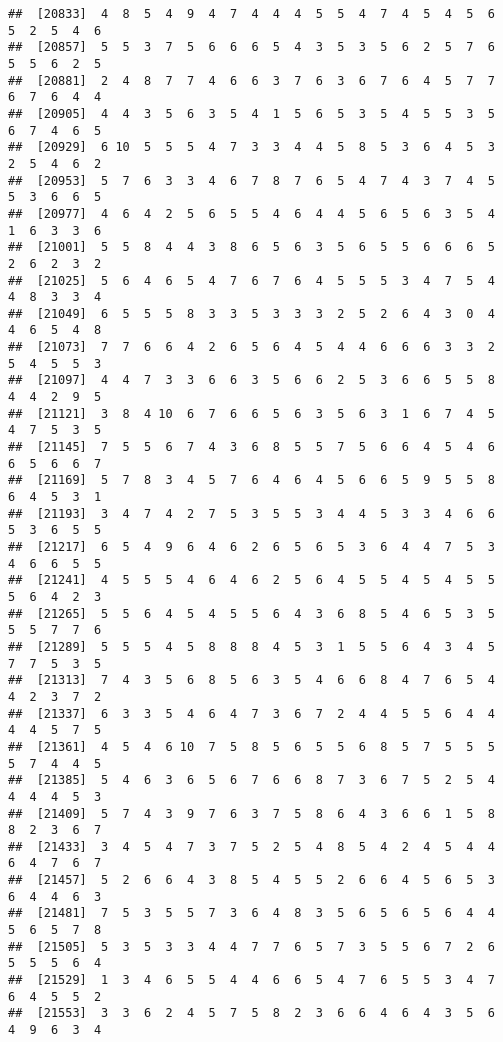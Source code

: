 \documentclass[
]{book}
\begin{document}
\begin{verbatim}
##  [20833]  4  8  5  4  9  4  7  4  4  4  5  5  4  7  4  5  4  5  6  5  2  5  4  6
##  [20857]  5  5  3  7  5  6  6  6  5  4  3  5  3  5  6  2  5  7  6  5  5  6  2  5
##  [20881]  2  4  8  7  7  4  6  6  3  7  6  3  6  7  6  4  5  7  7  6  7  6  4  4
##  [20905]  4  4  3  5  6  3  5  4  1  5  6  5  3  5  4  5  5  3  5  6  7  4  6  5
##  [20929]  6 10  5  5  5  4  7  3  3  4  4  5  8  5  3  6  4  5  3  2  5  4  6  2
##  [20953]  5  7  6  3  3  4  6  7  8  7  6  5  4  7  4  3  7  4  5  5  3  6  6  5
##  [20977]  4  6  4  2  5  6  5  5  4  6  4  4  5  6  5  6  3  5  4  1  6  3  3  6
##  [21001]  5  5  8  4  4  3  8  6  5  6  3  5  6  5  5  6  6  6  5  2  6  2  3  2
##  [21025]  5  6  4  6  5  4  7  6  7  6  4  5  5  5  3  4  7  5  4  4  8  3  3  4
##  [21049]  6  5  5  5  8  3  3  5  3  3  3  2  5  2  6  4  3  0  4  4  6  5  4  8
##  [21073]  7  7  6  6  4  2  6  5  6  4  5  4  4  6  6  6  3  3  2  5  4  5  5  3
##  [21097]  4  4  7  3  3  6  6  3  5  6  6  2  5  3  6  6  5  5  8  4  4  2  9  5
##  [21121]  3  8  4 10  6  7  6  6  5  6  3  5  6  3  1  6  7  4  5  4  7  5  3  5
##  [21145]  7  5  5  6  7  4  3  6  8  5  5  7  5  6  6  4  5  4  6  6  5  6  6  7
##  [21169]  5  7  8  3  4  5  7  6  4  6  4  5  6  6  5  9  5  5  8  6  4  5  3  1
##  [21193]  3  4  7  4  2  7  5  3  5  5  3  4  4  5  3  3  4  6  6  5  3  6  5  5
##  [21217]  6  5  4  9  6  4  6  2  6  5  6  5  3  6  4  4  7  5  3  4  6  6  5  5
##  [21241]  4  5  5  5  4  6  4  6  2  5  6  4  5  5  4  5  4  5  5  5  6  4  2  3
##  [21265]  5  5  6  4  5  4  5  5  6  4  3  6  8  5  4  6  5  3  5  5  5  7  7  6
##  [21289]  5  5  5  4  5  8  8  8  4  5  3  1  5  5  6  4  3  4  5  7  7  5  3  5
##  [21313]  7  4  3  5  6  8  5  6  3  5  4  6  6  8  4  7  6  5  4  4  2  3  7  2
##  [21337]  6  3  3  5  4  6  4  7  3  6  7  2  4  4  5  5  6  4  4  4  4  5  7  5
##  [21361]  4  5  4  6 10  7  5  8  5  6  5  5  6  8  5  7  5  5  5  5  7  4  4  5
##  [21385]  5  4  6  3  6  5  6  7  6  6  8  7  3  6  7  5  2  5  4  4  4  4  5  3
##  [21409]  5  7  4  3  9  7  6  3  7  5  8  6  4  3  6  6  1  5  8  8  2  3  6  7
##  [21433]  3  4  5  4  7  3  7  5  2  5  4  8  5  4  2  4  5  4  4  6  4  7  6  7
##  [21457]  5  2  6  6  4  3  8  5  4  5  5  2  6  6  4  5  6  5  3  6  4  4  6  3
##  [21481]  7  5  3  5  5  7  3  6  4  8  3  5  6  5  6  5  6  4  4  5  6  5  7  8
##  [21505]  5  3  5  3  3  4  4  7  7  6  5  7  3  5  5  6  7  2  6  5  5  5  6  4
##  [21529]  1  3  4  6  5  5  4  4  6  6  5  4  7  6  5  5  3  4  7  6  4  5  5  2
##  [21553]  3  3  6  2  4  5  7  5  8  2  3  6  6  4  6  4  3  5  6  4  9  6  3  4

\end{verbatim}
\end{document}
